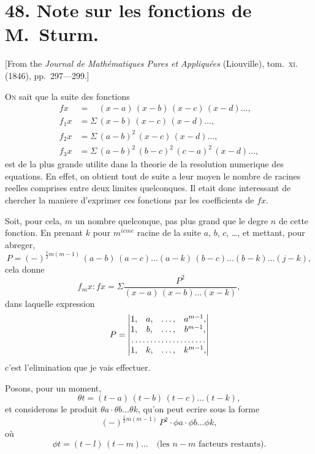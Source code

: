 \documentclass[12pt,a4paper]{article}
\theoremstyle{plain}
\begin{document}
\newpage


\section*{48. Note sur les fonctions de M.~Sturm.}

[From the \textit{Journal de Math\'ematiques Pures et Appliqu\'ees} (Liouville), tom.~\textsc{xi}. (1846), pp.~297---299.]

\bigskip

\textsc{On} sait que la suite des fonctions
\begin{align*}
fx &= \phantom{\Sigma\,}(x-a)\,(x-b)\,(x-c)\,(x-d) \ldots, \\
f_1x &= \Sigma\,(x-b)\,(x-c)\,(x-d) \ldots, \\
f_2x &= \Sigma\,(a-b)^2\,(x-c)\,(x-d) \ldots, \\
f_3x &= \Sigma\,(a-b)^2\,(b-c)^2\,(c-a)^2\,(x-d) \ldots,
\end{align*}
est de la plus grande utilite dans la theorie de la resolution numerique des equations. En effet, on obtient tout de suite a leur moyen le nombre de racines reelles comprises entre deux limites quelconques. Il etait donc interessant de chercher la maniere d'exprimer ces fonctions par les coefficients de $fx$.

Soit, pour cela, $m$ un nombre quelconque, pas plus grand que le degre $n$ de cette fonction. En prenant $k$ pour $m^{ieme}$ racine de la suite $a$, $b$, $c$, \ldots, et mettant, pour abreger,
\[
P = (-)^{\frac{1}{2}m(m-1)}\,(a-b)\,(a-c) \ldots (a-k)\,(b-c) \ldots (b-k) \ldots (j-k),
\]
cela donne
\[
f_mx : fx = \Sigma \frac{P^2}{(x-a)\,(x-b) \ldots (x-k)},
\]
dans laquelle expression
\[
P = \begin{vmatrix}
1, & a, & \ldots, & a^{m-1}, \\
1, & b, & \ldots, & b^{m-1}, \\
\multicolumn{4}{c}{\dotfill} \\
1, & k, & \ldots, & k^{m-1},
\end{vmatrix}
\]
c'est l'elimination que je vais effectuer.

Posons, pour un moment,
\[
\theta t = (t-a)\,(t-b)\,(t-c) \ldots (t-k),
\]
et considerons le produit $\theta a \cdot \theta b \ldots \theta k$, qu'on peut ecrire sous la forme
\[
(-)^{\frac{1}{2}m(m-1)}\,P^2 \cdot \phi a \cdot \phi b \ldots \phi k,
\]
où
\[
\phi t = (t-l)\,(t-m) \ldots \quad \text{(les $n-m$ facteurs restants).}
\]
\end{document}
